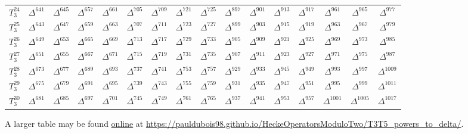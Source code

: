 \begin{center}
\begin{tabular}{|c||c|c|c|c|c|c|c|c|c|c|c|c|c|c|c|}
		$T_3^{24}$ & $\Delta^{641}$ & $\Delta^{645}$ & $\Delta^{657}$ & $\Delta^{661}$ & $\Delta^{705}$ & $\Delta^{709}$ & $\Delta^{721}$ & $\Delta^{725}$ & $\Delta^{897}$ & $\Delta^{901}$ & $\Delta^{913}$ & $\Delta^{917}$ & $\Delta^{961}$ & $\Delta^{965}$ & $\Delta^{977}$ \\
		$T_3^{25}$ & $\Delta^{643}$ & $\Delta^{647}$ & $\Delta^{659}$ & $\Delta^{663}$ & $\Delta^{707}$ & $\Delta^{711}$ & $\Delta^{723}$ & $\Delta^{727}$ & $\Delta^{899}$ & $\Delta^{903}$ & $\Delta^{915}$ & $\Delta^{919}$ & $\Delta^{963}$ & $\Delta^{967}$ & $\Delta^{979}$ \\
		$T_3^{26}$ & $\Delta^{649}$ & $\Delta^{653}$ & $\Delta^{665}$ & $\Delta^{669}$ & $\Delta^{713}$ & $\Delta^{717}$ & $\Delta^{729}$ & $\Delta^{733}$ & $\Delta^{905}$ & $\Delta^{909}$ & $\Delta^{921}$ & $\Delta^{925}$ & $\Delta^{969}$ & $\Delta^{973}$ & $\Delta^{985}$ \\
		$T_3^{27}$ & $\Delta^{651}$ & $\Delta^{655}$ & $\Delta^{667}$ & $\Delta^{671}$ & $\Delta^{715}$ & $\Delta^{719}$ & $\Delta^{731}$ & $\Delta^{735}$ & $\Delta^{907}$ & $\Delta^{911}$ & $\Delta^{923}$ & $\Delta^{927}$ & $\Delta^{971}$ & $\Delta^{975}$ & $\Delta^{987}$ \\
		$T_3^{28}$ & $\Delta^{673}$ & $\Delta^{677}$ & $\Delta^{689}$ & $\Delta^{693}$ & $\Delta^{737}$ & $\Delta^{741}$ & $\Delta^{753}$ & $\Delta^{757}$ & $\Delta^{929}$ & $\Delta^{933}$ & $\Delta^{945}$ & $\Delta^{949}$ & $\Delta^{993}$ & $\Delta^{997}$ & $\Delta^{1009}$ \\
		$T_3^{29}$ & $\Delta^{675}$ & $\Delta^{679}$ & $\Delta^{691}$ & $\Delta^{695}$ & $\Delta^{739}$ & $\Delta^{743}$ & $\Delta^{755}$ & $\Delta^{759}$ & $\Delta^{931}$ & $\Delta^{935}$ & $\Delta^{947}$ & $\Delta^{951}$ & $\Delta^{995}$ & $\Delta^{999}$ & $\Delta^{1011}$ \\
		$T_3^{30}$ & $\Delta^{681}$ & $\Delta^{685}$ & $\Delta^{697}$ & $\Delta^{701}$ & $\Delta^{745}$ & $\Delta^{749}$ & $\Delta^{761}$ & $\Delta^{765}$ & $\Delta^{937}$ & $\Delta^{941}$ & $\Delta^{953}$ & $\Delta^{957}$ & $\Delta^{1001}$ & $\Delta^{1005}$ & $\Delta^{1017}$ \\
		\hline
	\end{tabular}
\end{center}
A larger table may be found \href{https://pauldubois98.github.io/HeckeOperatorsModuloTwo/T3T5_powers_to_delta/}{online} at \url{https://pauldubois98.github.io/HeckeOperatorsModuloTwo/T3T5_powers_to_delta/}.





